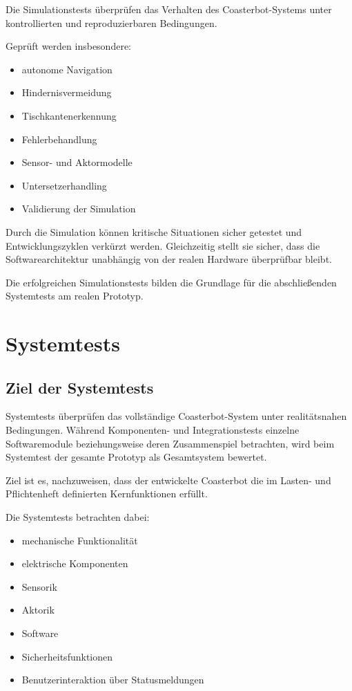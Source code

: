 Die Simulationstests überprüfen das Verhalten des Coasterbot-Systems
unter kontrollierten und reproduzierbaren Bedingungen.

Geprüft werden insbesondere:

\begin{itemize}
\tightlist
\item
  autonome Navigation
\item
  Hindernisvermeidung
\item
  Tischkantenerkennung
\item
  Fehlerbehandlung
\item
  Sensor- und Aktormodelle
\item
  Untersetzerhandling
\item
  Validierung der Simulation
\end{itemize}

Durch die Simulation können kritische Situationen sicher getestet und
Entwicklungszyklen verkürzt werden. Gleichzeitig stellt sie sicher, dass
die Softwarearchitektur unabhängig von der realen Hardware überprüfbar
bleibt.

Die erfolgreichen Simulationstests bilden die Grundlage für die
abschließenden Systemtests am realen Prototyp.

\section{Systemtests}\label{systemtests-1}

\subsection{Ziel der Systemtests}\label{ziel-der-systemtests}

Systemtests überprüfen das vollständige Coasterbot-System unter
realitätsnahen Bedingungen. Während Komponenten- und Integrationstests
einzelne Softwaremodule beziehungsweise deren Zusammenspiel betrachten,
wird beim Systemtest der gesamte Prototyp als Gesamtsystem bewertet.

Ziel ist es, nachzuweisen, dass der entwickelte Coasterbot die im
Lasten- und Pflichtenheft definierten Kernfunktionen erfüllt.

Die Systemtests betrachten dabei:

\begin{itemize}
\tightlist
\item
  mechanische Funktionalität
\item
  elektrische Komponenten
\item
  Sensorik
\item
  Aktorik
\item
  Software
\item
  Sicherheitsfunktionen
\item
  Benutzerinteraktion über Statusmeldungen
\end{itemize}

